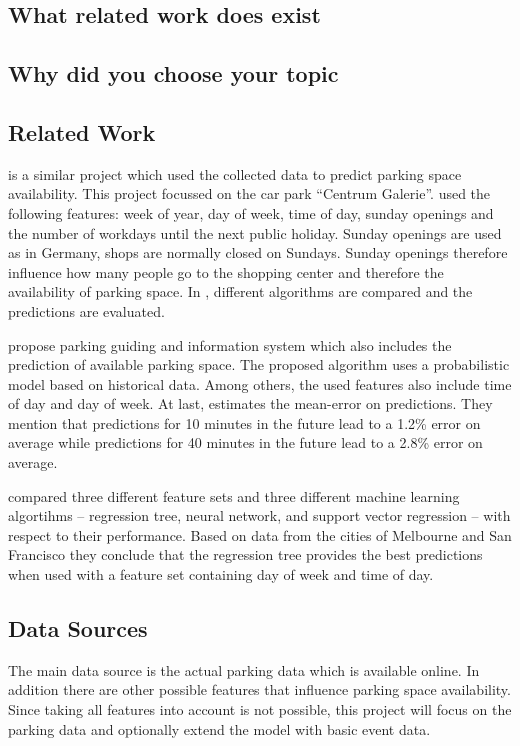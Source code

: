 \documentclass[journal,10pt]{IEEEtran}
\begin{document}
\subsection{What related work does exist}

\subsection{Why did you choose your topic}



\subsection{Related Work}
\cite{parkendd} is a similar project which used the collected data to predict parking space availability. This project focussed on the car park ``Centrum Galerie''. \cite{parkendd} used the following features: week of year, day of week, time of day, sunday openings and the number of workdays until the next public holiday. Sunday openings are used as in Germany, shops are normally closed on Sundays. Sunday openings therefore influence how many people go to the shopping center and therefore the availability of parking space. In \cite{parkendd}, different algorithms are compared and the predictions are evaluated.

\cite{Rajabioun2013} propose parking guiding and
information system which also includes the prediction of available parking space. The proposed algorithm uses a probabilistic model based on historical data. Among others, the used features also include time of day and day of week. At last, \cite{Rajabioun2013} estimates the mean-error on predictions. They mention that predictions for 10 minutes in the future lead to a 1.2\% error on average while predictions for 40 minutes in the future lead to a 2.8\% error on average.

\cite{Zheng2015} compared three different feature sets and three different machine learning algortihms -- regression tree, neural network, and support vector regression -- with respect to their performance. Based on data from the cities of Melbourne and San Francisco they conclude that the regression tree provides the best predictions when used with a feature set containing day of week and time of day.  



\subsection{Data Sources}\label{data sources}
The main data source is the actual parking data which is available online. In addition there are other possible features that influence parking space availability. Since taking all features into account is not possible, this project will focus on the parking data and optionally extend the model with basic event data.
\end{document}
